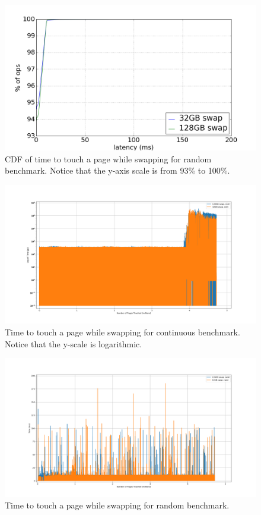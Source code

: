 \documentclass[twocolumn,11pt]{article}
\begin{document}
\begin{figure}
    \includegraphics[width=\columnwidth]{figures/swap_touch_time_rand_cdf}
    \caption{CDF of time to touch a page while swapping for random benchmark.
    Notice that the y-axis scale is from 93\% to 100\%.\label{fig:swap_time_rand_cdf}}
\end{figure}

\begin{figure}
    \includegraphics[width=\columnwidth]{figures/swap_time_cont}
    \caption{Time to touch a page while swapping for continuous benchmark.
    Notice that the y-scale is logarithmic.\label{fig:swap_time_cont}}
\end{figure}

\begin{figure}
    \includegraphics[width=\columnwidth]{figures/swap_time_rand}
    \caption{Time to touch a page while swapping for random benchmark.\label{fig:swap_time_rand}}
\end{figure}
\end{document}
